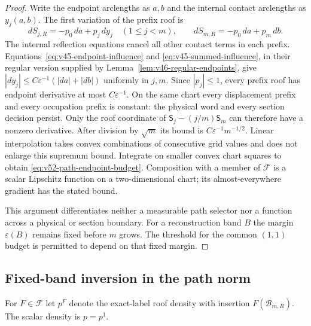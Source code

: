 \begin{proof}
Write the endpoint arclengths as $a,b$ and the internal contact
arclengths as $y_j(a,b)$. The first variation of the prefix roof is
\[
 dS_{j,R}=-p_0\,da+p_j\,dy_j\quad(1\le j<m),\qquad
 dS_{m,R}=-p_0\,da+p_m\,db.
\]
The internal reflection equations cancel all other contact terms in
each prefix. Equations~\eqref{eq:v45-endpoint-influence} and
\eqref{eq:v45-summed-influence}, in their regular version supplied by
Lemma~\ref{lem:v46-regular-endpoints}, give
$|dy_j|\le C\varepsilon^{-1}(|da|+|db|)$ uniformly in $j,m$.
Since $|p_j|\le1$, every prefix roof has endpoint derivative at most
$C\varepsilon^{-1}$. On the same chart every displacement prefix and
every occupation prefix is constant: the physical word and every
section decision persist. Only the roof coordinate of
$\mathsf S_j-(j/m)\mathsf S_m$ can therefore have a nonzero derivative.
After division by $\sqrt m$ its bound is
$C\varepsilon^{-1}m^{-1/2}$. Linear interpolation takes convex
combinations of consecutive grid values and does not enlarge this
supremum bound. Integrate on smaller convex chart squares to obtain
\eqref{eq:v52-path-endpoint-budget}. Composition with a member of
$\mathcal F$ is a scalar Lipschitz function on a two-dimensional
chart; its almost-everywhere gradient has the stated bound.

This argument differentiates neither a measurable path selector nor a
function across a physical or section boundary. For a reconstruction
band $B$ the margin $\varepsilon(B)$ remains fixed before $m$ grows.
The threshold for the common $(1,1)$ budget is permitted to depend on
that fixed margin.
\end{proof}

\subsection{Fixed-band inversion in the path norm}
For $F\in\mathcal F$ let $p^F$ denote the exact-label roof density
with insertion $F(\mathcal B_{m,R})$. The scalar density is $p=p^1$.

